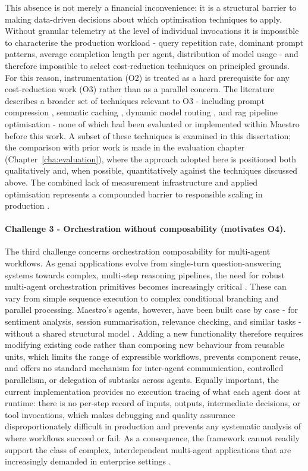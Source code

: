 This absence is not merely a financial inconvenience: it is a structural barrier to making data-driven decisions about which optimisation techniques to apply. Without granular telemetry at the level of individual invocations it is impossible to characterise the production workload - query repetition rate, dominant prompt patterns, average completion length per agent, distribution of model usage - and therefore impossible to select cost-reduction techniques on principled grounds. For this reason, instrumentation (O2) is treated as a hard prerequisite for any cost-reduction work (O3) rather than as a parallel concern. The literature describes a broader set of techniques relevant to O3 - including prompt compression \cite{jiang2023llmlingua, pan2024llmlingua2}, semantic caching \cite{bang2023gptcache}, dynamic model routing \cite{chen2023frugalgpt}, and \gls{rag} pipeline optimisation \cite{gao2023ragsurvey} - none of which had been evaluated or implemented within Maestro before this work. A subset of these techniques is examined in this dissertation; the comparison with prior work is made in the evaluation chapter (Chapter~\ref{cha:evaluation}), where the approach adopted here is positioned both qualitatively and, when possible, quantitatively against the techniques discussed above. The combined lack of measurement infrastructure and applied optimisation represents a compounded barrier to responsible scaling in production \cite{a16z2024llmflation}.

\paragraph{Challenge 3 - Orchestration without composability (motivates O4).}
The third challenge concerns orchestration composability for multi-agent workflows. As \gls{genai} applications evolve from single-turn question-answering systems towards complex, multi-step reasoning pipelines, the need for robust multi-agent orchestration primitives becomes increasingly critical \cite{wang2023survey}. These can vary from simple sequence execution to complex conditional branching and parallel processing. Maestro's agents, however, have been built case by case - for sentiment analysis, session summarisation, relevance checking, and similar tasks - without a shared structural model \cite{closer2025maestro}. Adding a new functionality therefore requires modifying existing code rather than composing new behaviour from reusable units, which limits the range of expressible workflows, prevents component reuse, and offers no standard mechanism for inter-agent communication, controlled parallelism, or delegation of subtasks across agents. Equally important, the current implementation provides no execution tracing of what each agent does at runtime: there is no per-step record of inputs, outputs, intermediate decisions, or tool invocations, which makes debugging and quality assurance disproportionately difficult in production and prevents any systematic analysis of where workflows succeed or fail. As a consequence, the framework cannot readily support the class of complex, interdependent multi-agent applications that are increasingly demanded in enterprise settings \cite{wang2023survey}.


